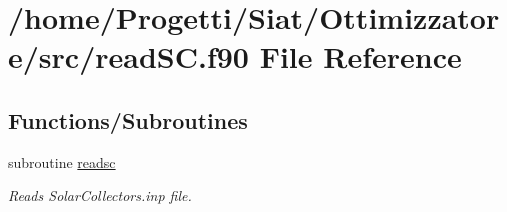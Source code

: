 \hypertarget{read_s_c_8f90}{\section{/home/\-Progetti/\-Siat/\-Ottimizzatore/src/read\-S\-C.f90 File Reference}
\label{read_s_c_8f90}
}
\subsection*{Functions/\-Subroutines}
\begin{DoxyCompactItemize}
\item 
subroutine \hyperlink{read_s_c_8f90_ac61b0f9600e1b2020b151202682c41f4}{readsc}
\begin{DoxyCompactList}\small\item\em Reads Solar\-Collectors.\-inp file. \end{DoxyCompactList}\end{DoxyCompactItemize}


